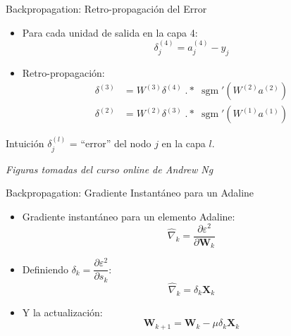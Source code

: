 \documentclass[aspectratio=169,utf8,spanish]{beamer}
\DeclareMathOperator{\sgm}{sgm}
\begin{document}
\begin{frame}{Backpropagation: Retro-propagación del Error}
  \begin{itemize}
    \item Para cada unidad de salida en la capa 4:
    \begin{equation*}
      \delta_j^{(4)} = a_j^{(4)} - y_j
    \end{equation*}
    \item Retro-propagación:
    \begin{align*}
      \delta^{(3)} &= W^{(3)} \delta^{(4)} \;.\!*\; \sgm'(W^{(2)} a^{(2)}) \\
      \delta^{(2)} &= W^{(2)} \delta^{(3)} \;.\!*\; \sgm'(W^{(1)} a^{(1)})
    \end{align*}
  \end{itemize}

  \begin{block}{Intuición}
    $\delta_j^{(l)}$ = ``error'' del nodo $j$ en la capa $l$.
  \end{block}
  \begin{center}
    \textit{Figuras tomadas del curso online de Andrew Ng}
  \end{center}
\end{frame}

\begin{frame}{Backpropagation: Gradiente Instantáneo para un Adaline}
  \begin{itemize}
    \item Gradiente instantáneo para un elemento Adaline:
    \begin{equation*}
      \hat{\nabla}_k = \frac{\partial \varepsilon^2}{\partial \mathbf{W}_k}
    \end{equation*}
    \item Definiendo $\delta_k = \dfrac{\partial \varepsilon^2}{\partial s_k}$:
    \begin{equation*}
      \hat{\nabla}_k = \delta_k \mathbf{X}_k
    \end{equation*}
    \item Y la actualización:
    \begin{equation*}
      \mathbf{W}_{k+1} = \mathbf{W}_k - \mu \delta_k \mathbf{X}_k
    \end{equation*}
  \end{itemize}
\end{frame}
\end{document}
